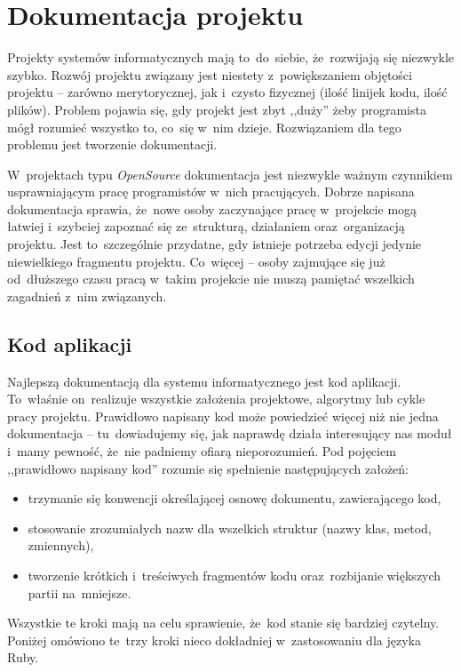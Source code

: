\section{Dokumentacja projektu} \label{dokumentacja}

Projekty systemów informatycznych mają to~do~siebie, że~rozwijają się niezwykle szybko. Rozwój projektu związany jest niestety z~powiększaniem objętości projektu -- zarówno merytorycznej, jak i~czysto fizycznej (ilość linijek kodu, ilość plików). Problem pojawia się, gdy projekt jest zbyt ,,duży'' żeby programista mógł rozumieć wszystko to, co~się w~nim dzieje. Rozwiązaniem dla tego problemu jest tworzenie dokumentacji.


W~projektach typu \textit{OpenSource} dokumentacja jest niezwykle ważnym czynnikiem usprawniającym pracę programistów w~nich pracujących. Dobrze napisana dokumentacja sprawia, że~nowe osoby zaczynające pracę w~projekcie mogą łatwiej i~szybciej zapoznać się ze~strukturą, działaniem oraz~organizacją projektu. Jest to~szczególnie przydatne, gdy istnieje potrzeba edycji jedynie niewielkiego fragmentu projektu. Co~więcej -- osoby zajmujące się już od~dłuższego czasu pracą w~takim projekcie nie muszą pamiętać wszelkich zagadnień z~nim związanych.


\subsection{Kod aplikacji} \label{dokumentacja.kod}

Najlepszą dokumentacją dla systemu informatycznego jest kod aplikacji. To~właśnie on~realizuje wszystkie założenia projektowe, algorytmy lub cykle pracy projektu. Prawidłowo napisany kod może powiedzieć więcej niż nie jedna dokumentacja -- tu~dowiadujemy się, jak naprawdę działa interesujący nas moduł i~mamy pewność, że~nie padniemy ofiarą nieporozumień. Pod pojęciem ,,prawidłowo napisany kod'' rozumie się spełnienie następujących założeń:

\begin{itemize}
  \item trzymanie się konwencji określającej osnowę dokumentu, zawierającego kod,
  \item stosowanie zrozumiałych nazw dla wszelkich struktur (nazwy klas, metod, zmiennych),
  \item tworzenie krótkich i~treściwych fragmentów kodu oraz~rozbijanie większych partii na~mniejsze.
\end{itemize}

Wszystkie te kroki mają na celu sprawienie, że~kod stanie się bardziej czytelny. Poniżej omówiono te~trzy kroki nieco dokładniej w~zastosowaniu dla języka Ruby.

